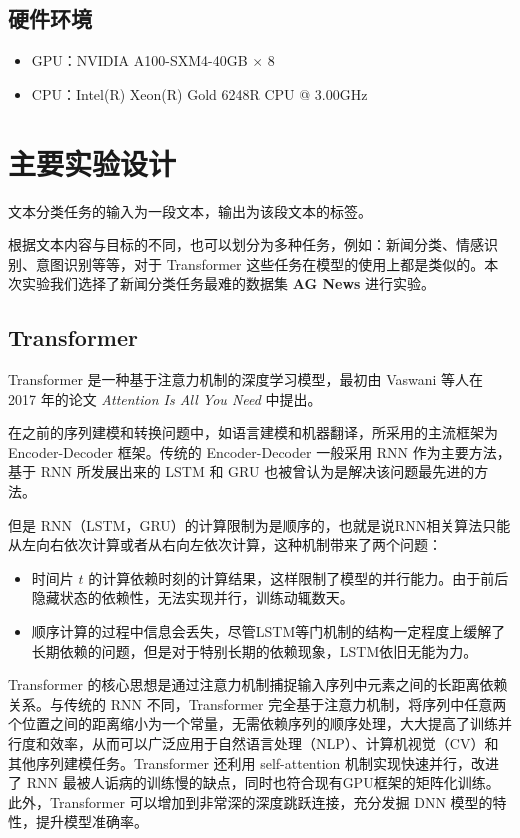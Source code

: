 \subsection{硬件环境}
\begin{itemize}
    \item GPU：NVIDIA A100-SXM4-40GB $\times$ 8
    \item CPU：Intel(R) Xeon(R) Gold 6248R CPU @ 3.00GHz
\end{itemize}

\section{主要实验设计}

文本分类任务的输入为一段文本，输出为该段文本的标签。

根据文本内容与目标的不同，也可以划分为多种任务，例如：新闻分类、情感识别、意图识别等等，对于 Transformer 这些任务在模型的使用上都是类似的。本次实验我们选择了新闻分类任务最难的数据集 \textbf{AG News} 进行实验。

\subsection{Transformer}

Transformer 是一种基于注意力机制的深度学习模型，最初由 Vaswani 等人在 2017 年的论文 \textit{Attention Is All You Need} 中提出。\cite{NIPS2017_3f5ee243}

在之前的序列建模和转换问题中，如语言建模和机器翻译，所采用的主流框架为Encoder-Decoder 框架。传统的 Encoder-Decoder 一般采用 RNN 作为主要方法，基于 RNN 所发展出来的 LSTM 和 GRU 也被曾认为是解决该问题最先进的方法。

但是 RNN（LSTM，GRU）的计算限制为是顺序的，也就是说RNN相关算法只能从左向右依次计算或者从右向左依次计算，这种机制带来了两个问题：\begin{itemize}
    \item 时间片 $t$ 的计算依赖时刻的计算结果，这样限制了模型的并行能力。由于前后隐藏状态的依赖性，无法实现并行，训练动辄数天。
    \item 顺序计算的过程中信息会丢失，尽管LSTM等门机制的结构一定程度上缓解了长期依赖的问题，但是对于特别长期的依赖现象，LSTM依旧无能为力。
\end{itemize}
Transformer 的核心思想是通过注意力机制捕捉输入序列中元素之间的长距离依赖关系。与传统的 RNN 不同，Transformer 完全基于注意力机制，将序列中任意两个位置之间的距离缩小为一个常量，无需依赖序列的顺序处理，大大提高了训练并行度和效率，从而可以广泛应用于自然语言处理（NLP）、计算机视觉（CV）和其他序列建模任务。Transformer 还利用 self-attention 机制实现快速并行，改进了 RNN 最被人诟病的训练慢的缺点，同时也符合现有GPU框架的矩阵化训练。此外，Transformer 可以增加到非常深的深度跳跃连接，充分发掘 DNN 模型的特性，提升模型准确率。


